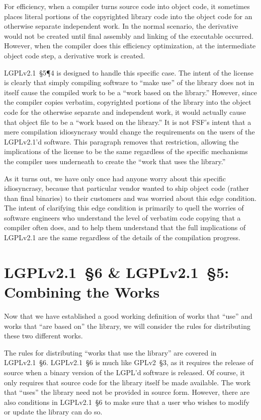 For efficiency, when a compiler turns source code into object code, it
sometimes places literal portions of the copyrighted library code into the
object code for an otherwise separate independent work. In the normal
scenario, the derivative would not be created until final assembly and
linking of the executable occurred. However, when the compiler does this
efficiency optimization, at the intermediate object code step, a
derivative work is created.

LGPLv2.1~\S5\P4 is designed to handle this specific case. The intent of
the license is clearly that simply compiling software to ``make use'' of
the library does not in itself cause the compiled work to be a ``work
based on the library.''  However, since the compiler copies verbatim,
copyrighted portions of the library into the object code for the otherwise
separate and independent work, it would actually cause that object file to be a
``work based on the library.''  It is not FSF's intent that a mere
compilation idiosyncrasy would change the requirements on the users of the
LGPLv2.1'd software. This paragraph removes that restriction, allowing the
implications of the license to be the same regardless of the specific
mechanisms the compiler uses underneath to create the ``work that uses the
library.''

As it turns out, we have only once had anyone worry about this specific
idiosyncrasy, because that particular vendor wanted to ship object code
(rather than final binaries) to their customers and was worried about
this edge condition. The intent of clarifying this edge condition is
primarily to quell the worries of software engineers who understand the
level of verbatim code copying that a compiler often does, and to help
them understand that the full implications of LGPLv2.1 are the same regardless
of the details of the compilation progress.

\section{LGPLv2.1~\S6 \& LGPLv2.1~\S5: Combining the Works}
\label{lgpl-section-6}
Now that we have established a good working definition of works that
``use'' and works that ``are based on'' the library, we will consider the
rules for distributing these two different works.

The rules for distributing ``works that use the library'' are covered in
LGPLv2.1~\S6\@. LGPLv2.1~\S6 is much like GPLv2~\S3, as it requires the release
of source when a binary version of the LGPL'd software is released. Of
course, it only requires that source code for the library itself be made
available. The work that ``uses'' the library need not be provided in
source form. However, there are also conditions in LGPLv2.1~\S6 to make sure
that a user who wishes to modify or update the library can do so.

